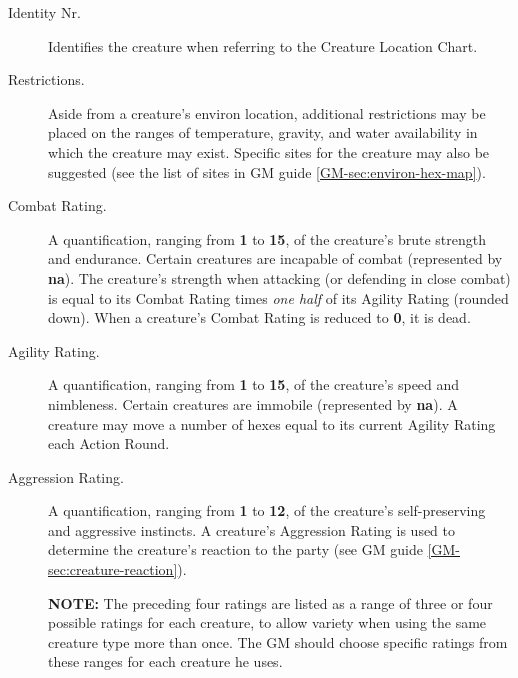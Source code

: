 \begin{description}
\item[Identity Nr.] Identifies the creature when referring to the
  Creature Location Chart.
\item[Restrictions.] Aside from a creature's environ location,
  additional restrictions may be placed on the ranges of temperature,
  gravity, and water availability in which the creature may exist.
  Specific sites for the creature may also be suggested (see the list
  of sites in GM guide \ref{GM-sec:environ-hex-map}).
\item[Combat Rating.] A quantification, ranging from \textbf{1} to
  \textbf{15}, of the creature's brute strength and endurance. Certain
  creatures are incapable of combat (represented by \textbf{na}). The
  creature's strength when attacking (or defending in close combat) is
  equal to its Combat Rating times \emph{one half} of its Agility
  Rating (rounded down). When a creature's Combat Rating is reduced to
  \textbf{0}, it is dead.
\item[Agility Rating.] A quantification, ranging from \textbf{1} to
  \textbf{15}, of the creature's speed and nimbleness. Certain
  creatures are immobile (represented by \textbf{na}). A creature may
  move a number of hexes equal to its current Agility Rating each
  Action Round.
\item[Aggression Rating.] A quantification, ranging from \textbf{1} to
  \textbf{12}, of the creature's self-preserving and aggressive
  instincts. A creature's Aggression Rating is used to determine the
  creature's reaction to the party (see
  GM guide \ref{GM-sec:creature-reaction}).
  
  \textbf{NOTE:} The preceding four ratings are listed as a range of
  three or four possible ratings for each creature, to allow variety
  when using the same creature type more than once. The GM should
  choose specific ratings from these ranges for each creature he uses.
  

\end{description}
